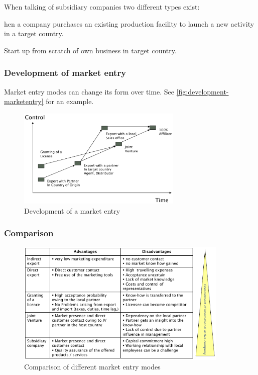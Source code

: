 When talking of subsidiary companies two different types exist:

\begin{description}
	\tightlist
	\item[Brownfield] hen a company purchases an existing production facility to launch a new activity in a target country.
	\item[Greenfield] Start up from scratch of own business in target country.
\end{description}

\subsubsection{Development of market entry}
Market entry modes can change its form over time. See \autoref{fig:development-marketentry} for an example.
\begin{figure}[H]
	\centering
	\includegraphics[width=0.7\textwidth]{figures/developmentMarketEntry.png}
	\caption{Development of a market entry}
	\label{fig:development-marketentry}
\end{figure}

\subsubsection{Comparison}
\begin{figure}[H]
	\centering
	\includegraphics[width=0.9\textwidth]{figures/comparisonMarketEntry.png}
	\caption{Comparison of different market entry modes}
\end{figure}

